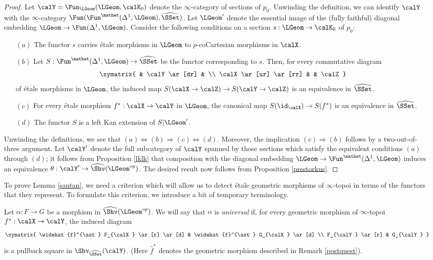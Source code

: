 \begin{proof}
Let $\calY = \Fun_{ \LGeom}( \LGeom, \calK_0)$ denote the $\infty$-category of sections of $p_0$. Unwinding the definition, we can identify $\calY$ with the $\infty$-category
$\Fun( \Fun^{\mathet}( \Delta^1, \LGeom),\widehat{\SSet})$.
Let $\LGeom'$ denote the essential image of the (fully faithful) diagonal embedding
$\LGeom \rightarrow \Fun( \Delta^1, \LGeom)$. Consider the following conditions on a section $s: \LGeom \rightarrow \calK_0$ of $p_0$:
\begin{itemize}
\item[$(a)$] The functor $s$ carries \'{e}tale morphisms in $\LGeom$ to $p$-coCartesian morphisms in $\calX$.
\item[$(b)$] Let $S: \Fun^{\mathet}( \Delta^1, \LGeom) \rightarrow \widehat{\SSet}$ be the functor
corresponding to $s$. Then, for every commutative diagram
$$ \xymatrix{ & \calY \ar[dr] & \\
\calX \ar[ur] \ar[rr] & & \calZ }$$
of \'{e}tale morphisms in $\LGeom$, the induced map
$S(\calX \rightarrow \calZ) \rightarrow S(\calY \rightarrow \calZ)$ is an equivalence in $\widehat{\SSet}$.
\item[$(c)$] For every \'{e}tale morphism $f^{\ast}: \calX \rightarrow \calY$ in $\LGeom$, the canonical
map $S( \id_{\calX} ) \rightarrow S(f^{\ast})$ is an equivalence in $\widehat{\SSet}$.
\item[$(d)$] The functor $S$ is a left Kan extension of $S | \LGeom'$.
\end{itemize}
Unwinding the definitions, we see that $(a) \Leftrightarrow (b) \Rightarrow (c) \Leftrightarrow (d)$.
Moreover, the implication $(c) \Rightarrow (b)$ follows by a two-out-of-three argument.
Let $\calY'$ denote the full subcategory of $\calY$ spanned by those sections which
satisfy the equivalent conditions $(a)$ through $(d)$; it follows from Proposition \ref{lklk}
that composition with the diagonal embedding $\LGeom \rightarrow \Fun^{\mathet}( \Delta^1, \LGeom)$ induces an equivalence $\theta: \calY' \rightarrow \widehat{\Shv}(\LGeom^{op})$. The desired result now follows from Proposition \ref{prestorkus}.
\end{proof}

To prove Lemma \ref{santan}, we need a criterion which will allow us to detect \'{e}tale geometric morphisms of $\infty$-topoi in terms of the functors that they represent. To formulate this criterion, we introduce a bit of temporary terminology.

\begin{definition}\label{squee}
Let $\alpha: F \rightarrow G$ be a morphism in $\widehat{\Shv}(\LGeom^{op})$. We will say that
$\alpha$ is {\it universal} if, for every geometric morphism of $\infty$-topoi
$f^{\ast}: \calX \rightarrow \calY$, the induced diagram
$$ \xymatrix{ \widehat{f}^{\ast} F_{\calX} \ar[r] \ar[d] & \widehat{f}^{\ast} G_{\calX} \ar[d] \\
F_{\calY} \ar[r] & G_{\calY} }$$
is a pullback square in $\Shv_{ \widehat{\SSet}}( \calY)$. (Here $\widehat{f}^{\ast}$ denotes
the geometric morphism described in Remark \ref{postquest}).
\end{definition}

